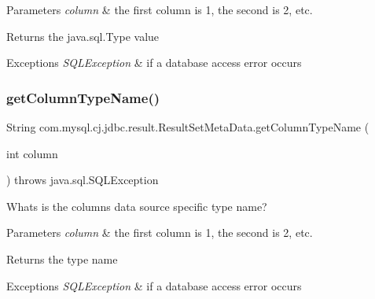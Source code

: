 \begin{DoxyParams}{Parameters}
{\em column} & the first column is 1, the second is 2, etc.\\
\hline
\end{DoxyParams}
\begin{DoxyReturn}{Returns}
the java.\+sql.\+Type value
\end{DoxyReturn}

\begin{DoxyExceptions}{Exceptions}
{\em S\+Q\+L\+Exception} & if a database access error occurs \\
\hline
\end{DoxyExceptions}
\mbox{\label{classcom_1_1mysql_1_1cj_1_1jdbc_1_1result_1_1_result_set_meta_data_a9d676c2fb0aa1e384e96d677f130072d}} 
\subsubsection{\texorpdfstring{get\+Column\+Type\+Name()}{getColumnTypeName()}}
{\footnotesize\ttfamily String com.\+mysql.\+cj.\+jdbc.\+result.\+Result\+Set\+Meta\+Data.\+get\+Column\+Type\+Name (\begin{DoxyParamCaption}\item[{int}]{column }\end{DoxyParamCaption}) throws java.\+sql.\+S\+Q\+L\+Exception}

Whats is the column\textquotesingle{}s data source specific type name?


\begin{DoxyParams}{Parameters}
{\em column} & the first column is 1, the second is 2, etc.\\
\hline
\end{DoxyParams}
\begin{DoxyReturn}{Returns}
the type name
\end{DoxyReturn}

\begin{DoxyExceptions}{Exceptions}
{\em S\+Q\+L\+Exception} & if a database access error occurs \\
\hline
\end{DoxyExceptions}
\mbox{\label{classcom_1_1mysql_1_1cj_1_1jdbc_1_1result_1_1_result_set_meta_data_a7c21fafb34354c4ab2a14b390756f85c}} 
